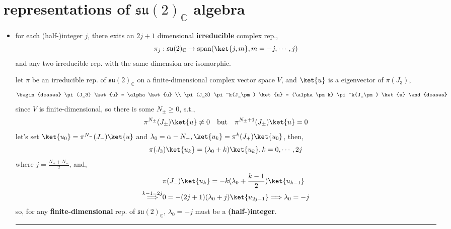 \section{representations of \texorpdfstring{$\mathfrak{su}(2)_\mathbb{C}$}{su(2)\_C} algebra}
\begin{itemize}
	\item for each (half-)integer $j$, there exits an $2 j + 1$ dimensional \textbf{irreducible} complex rep.,
	\begin{equation}
		\pi_j : \mathfrak{su}(2)_\mathbb{C} \rightarrow \mathrm{span}(\ket{j, m}, m = - j, \cdots, j)
	\end{equation}
	and any two irreducible rep. with the same dimension are isomorphic.
	
	\begin{tcolorbox}[title=proof:]
		let $\pi$ be an irreducible rep. of $\mathfrak{su}(2)_\mathbb{C}$ on a finite-dimensional complex vector space $V$, and $\ket{u}$ is a eigenvector of $\pi(J_3)$,
		\begin{equation}
			\begin{dcases}
				\pi(J_3) \ket{u} = \alpha \ket{u} \\
				\pi(J_3) \pi^k(J_\pm) \ket{u} = (\alpha \pm k) \pi^k(J_\pm) \ket{u}
			\end{dcases}
		\end{equation}
		since $V$ is finite-dimensional, so there is some $N_\pm \geq 0$, s.t.,
		\begin{equation}
			\pi^{N_\pm}(J_\pm) \ket{u} \neq 0 \quad \text{but} \quad \pi^{N_\pm + 1}(J_\pm) \ket{u} = 0
		\end{equation}
		let's set $\ket{u_0} = \pi^{N_-}(J_-) \ket{u}$ and $\lambda_0 = \alpha - N_-, \ket{u_k} = \pi^k(J_+) \ket{u_0}$, then,
		\begin{equation}
			\pi(J_3) \ket{u_k} = (\lambda_0 + k) \ket{u_k}, k = 0, \cdots, 2 j
		\end{equation}
		where $j = \frac{N_+ + N_-}{2}$, and,
		\begin{align}
			& \pi(J_-) \ket{u_k} = - k (\lambda_0 + \frac{k - 1}{2}) \ket{u_{k - 1}} \notag \\
			\overset{k - 1 = 2 j}{\Longrightarrow} & 0 = - (2 j + 1) (\lambda_0 + j) \ket{u_{2 j - 1}} \Longrightarrow \lambda_0 = - j
		\end{align}
		so, for any \textbf{finite-dimensional} rep. of $\mathfrak{su}(2)_\mathbb{C}$, $\lambda_0 = - j$ must be a \textbf{(half-)integer}.
		
		\noindent\rule[0.5ex]{\linewidth}{0.5pt} %
		

\end{tcolorbox}
\end{itemize}
